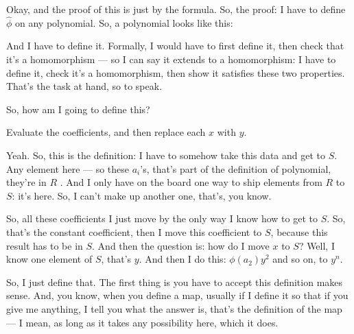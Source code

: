 \begin{proofWrapper}

\begin{speech}[00:09:00 - 00:09:48]
Okay, and the proof of this is just by the formula. So, the proof:  I have to define $\hat{\phi}$ on any polynomial. So, a polynomial looks like this: 

And I have to define it. Formally, I would have to first define it, then check that it's a homomorphism --- so I can say it extends to a homomorphism: I have to define it, check it's a homomorphism, then show it satisfies these two properties. That's the task at hand, so to speak.

So, how am I going to define this?
\end{speech}

\begin{student}
Evaluate the coefficients, and then replace each $x$ with $y$.
\end{student}

\begin{speech}[00:09:53 - 00:10:45]
Yeah. So, this is the definition: I have to somehow take this data and get to $S$. Any element here --- so these $a_i$'s, that's part of the definition of polynomial, they're in $R$ . And I only have on the board one way to ship elements from $R$ to $S$: it's here. So, I can't make up another one, that's, you know.

So, all these coefficients I just move by the only way I know how to get to $S$. So, that's the constant coefficient, then I move this coefficient to $S$, because this result has to be in $S$. And then the question is: how do I move $x$ to $S$? Well, I know one element of $S$, that's $y$. And then I do this: $\phi(a_2) y^2$ and so on, to $y^n$. 
\end{speech}

\begin{speech}[00:10:45 - 00:12:20]
So, I just define that. The first thing is you have to accept this definition makes sense. And, you know, when you define a map, usually if I define it so that if you give me anything, I tell you what the answer is, that's the definition of the map --- I mean, as long as it takes any possibility here, which it does.


\end{speech}
\end{proofWrapper}
